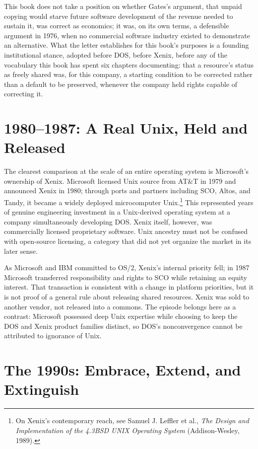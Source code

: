 \documentclass[11pt]{book}
\begin{document}
This book does not take a position on whether Gates's argument, that unpaid copying would starve future software development of the revenue needed to sustain it, was correct as economics; it was, on its own terms, a defensible argument in 1976, when no commercial software industry existed to demonstrate an alternative. What the letter establishes for this book's purposes is a founding institutional stance, adopted before DOS, before Xenix, before any of the vocabulary this book has spent six chapters documenting: that a resource's status as freely shared was, for this company, a starting condition to be corrected rather than a default to be preserved, whenever the company held rights capable of correcting it.

\section{1980--1987: A Real Unix, Held and Released}

The clearest comparison at the scale of an entire operating system is Microsoft's ownership of Xenix. Microsoft licensed Unix source from AT\&T in 1979 and announced Xenix in 1980; through ports and partners including SCO, Altos, and Tandy, it became a widely deployed microcomputer Unix.\footnote{On Xenix's contemporary reach, see Samuel J. Leffler et al., \emph{The Design and Implementation of the 4.3BSD UNIX Operating System} (Addison-Wesley, 1989).} This represented years of genuine engineering investment in a Unix-derived operating system at a company simultaneously developing DOS. Xenix itself, however, was commercially licensed proprietary software. Unix ancestry must not be confused with open-source licensing, a category that did not yet organize the market in its later sense.

As Microsoft and IBM committed to OS/2, Xenix's internal priority fell; in 1987 Microsoft transferred responsibility and rights to SCO while retaining an equity interest. That transaction is consistent with a change in platform priorities, but it is not proof of a general rule about releasing shared resources. Xenix was sold to another vendor, not released into a commons. The episode belongs here as a contrast: Microsoft possessed deep Unix expertise while choosing to keep the DOS and Xenix product families distinct, so DOS's nonconvergence cannot be attributed to ignorance of Unix.

\section{The 1990s: Embrace, Extend, and Extinguish}
\end{document}
